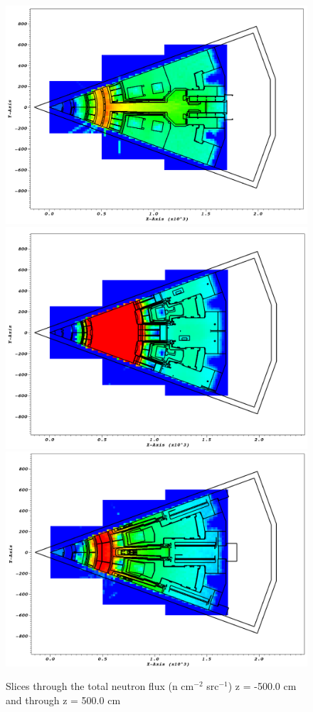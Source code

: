\documentclass[12pt]{article}
\begin{document}
\begin{figure}[ht!]
  \centering
  \includegraphics[scale=0.27]{../plots/neutron/nob4c/z_-500.png}
  \includegraphics[scale=0.27]{../plots/neutron/nob4c/z_0.png}       
  \includegraphics[scale=0.27]{../plots/neutron/nob4c/z_500.png}
  \caption{Slices through the total neutron flux (n cm$^{-2}$ src$^{-1}$)
  z = -500.0 cm and through z = 500.0 cm}
  \label{fig:wwinp}
\end{figure}
\newpage
\clearpage
\end{document}
